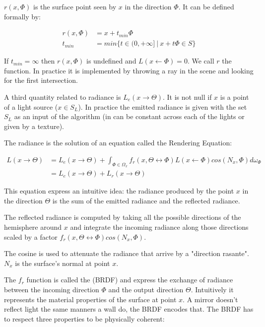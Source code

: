 $r(x, \Phi)$ is the surface point seen by $x$ in the direction $\Phi$. It can be defined formally by:

\begin{align*}
r(x, \Phi) &= x + t_{min}\Phi \\
t_{min} &= min \lbrace t \in (0, +\infty]~ |~ x + t\Phi \in S \rbrace
\end{align*}

If $t_{min} = \infty$ then $r(x, \Phi)$ is undefined and $L(x \leftarrow \Phi) = 0$. We call $r$ the  function. In practice it is implemented by throwing a ray in the scene and looking for the first intersection.

A third quantity related to radiance is  $L_e(x \rightarrow \Theta)$. It is not null if $x$ is a point of a light source ($x \in S_L$). In practice the emitted radiance is given with the set $S_L$ as an input of the algorithm (in can be constant across each of the lights or given by a texture).

The radiance is the solution of an equation called the Rendering Equation:

\begin{align*}
L(x \rightarrow \Theta) &= L_e(x \rightarrow \Theta) + \int_{\Phi \in \Omega_x} f_r(x, \Theta \leftrightarrow \Phi) L(x \leftarrow \Phi) cos(N_x, \Phi) d\omega_\Phi \\
&= L_e(x \rightarrow \Theta) + L_r(x \rightarrow \Theta)
\end{align*}

This equation express an intuitive idea: the radiance produced by the point $x$ in the direction $\Theta$ is the sum of the emitted radiance and the reflected radiance. 

The reflected radiance is computed by taking all the possible directions of the hemisphere around $x$ and integrate the incoming radiance along those directions scaled by a factor $f_r(x, \Theta \leftrightarrow \Phi) cos(N_x, \Phi)$. 

The cosine is used to attenuate the radiance that arrive by a "direction rasante". $N_x$ is the surface's normal at point $x$.

The $f_r$ function is called the  (BRDF) and express the exchange of radiance between the incoming direction $\Phi$ and the output direction $\Theta$. Intuitively it represents the material properties of the surface at point $x$. A mirror doesn't reflect light the same manners a wall do, the BRDF encodes that. The BRDF has to respect three properties to be physically coherent:

